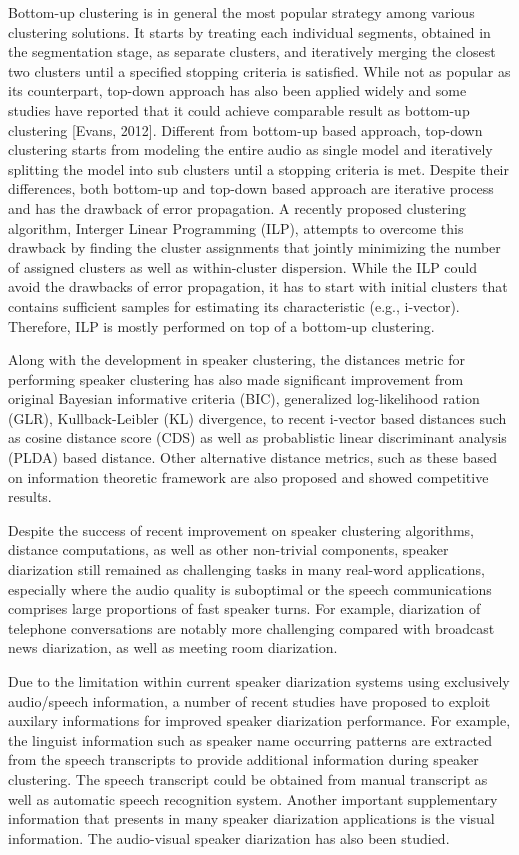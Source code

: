 \documentclass[journal]{IEEEtran}
\begin{document}
Bottom-up clustering is in general the most popular strategy among various clustering solutions. It starts by treating each individual segments, obtained in the segmentation stage, as separate clusters, and iteratively merging the closest two clusters until a specified stopping criteria is satisfied. While not as popular as its counterpart, top-down approach has also been applied widely and some studies have reported that it could achieve comparable result as bottom-up clustering [Evans, 2012]. Different from bottom-up based approach, top-down clustering starts from modeling the entire audio as single model and iteratively splitting the model into sub clusters until a stopping criteria is met. Despite their differences, both bottom-up and top-down based approach are iterative process and has the drawback of error propagation. A recently proposed clustering algorithm, Interger Linear Programming (ILP), attempts to overcome this drawback by finding the cluster assignments that jointly minimizing the number of assigned clusters as well as within-cluster dispersion. While the ILP could avoid the drawbacks of error propagation, it has to start with initial clusters that contains sufficient samples for estimating its characteristic (e.g., i-vector). Therefore, ILP is mostly performed on top of a bottom-up clustering.

Along with the development in speaker clustering, the distances metric for performing speaker clustering has also made significant improvement from original Bayesian informative criteria (BIC), generalized log-likelihood ration (GLR), Kullback-Leibler (KL) divergence, to recent i-vector based distances such as cosine distance score (CDS) as well as probablistic linear discriminant analysis (PLDA) based distance. Other alternative distance metrics, such as these based on information theoretic framework are also proposed and showed competitive results. 

Despite the success of recent improvement on speaker clustering algorithms, distance computations, as well as other non-trivial components, speaker diarization still remained as challenging tasks in many real-word applications, especially where the audio quality is suboptimal or the speech communications comprises large proportions of fast speaker turns. For example, diarization of telephone conversations are notably more challenging compared with broadcast news diarization, as well as meeting room diarization. 

Due to the limitation within current speaker diarization systems using exclusively audio/speech information, a number of recent studies have proposed to exploit auxilary informations for improved speaker diarization performance. For example, the linguist information such as speaker name occurring patterns are extracted from the speech transcripts to provide additional information during speaker clustering. The speech transcript could be obtained from manual transcript as well as automatic speech recognition system. Another important supplementary information that presents in many speaker diarization applications is the visual information. The audio-visual speaker diarization has also been studied.
\end{document}
